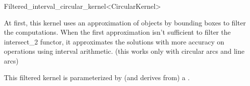 \begin{ccRefClass}{Filtered_interval_circular_kernel<CircularKernel>}

\ccDefinition

At first, this kernel uses an approximation of objects by bounding boxes to filter the 
computations. When the first approximation isn't sufficient to filter the intersect_2
functor, it approximates the solutions with more accuracy on operations using
interval arithmetic. (this works only with circular arcs and line arcs)


\ccIsModel


\ccParameters

This filtered kernel is parameterized by (and derives from) a . 

\end{ccRefClass}
